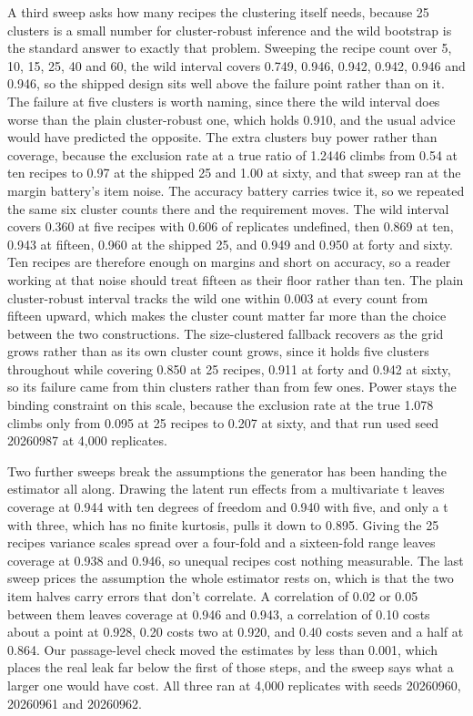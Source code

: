 A third sweep asks how many recipes the clustering itself needs, because 25 clusters is a small number for cluster-robust inference and the wild bootstrap is the standard answer to exactly that problem. Sweeping the recipe count over 5, 10, 15, 25, 40 and 60, the wild interval covers 0.749, 0.946, 0.942, 0.942, 0.946 and 0.946, so the shipped design sits well above the failure point rather than on it. The failure at five clusters is worth naming, since there the wild interval does worse than the plain cluster-robust one, which holds 0.910, and the usual advice would have predicted the opposite. The extra clusters buy power rather than coverage, because the exclusion rate at a true ratio of 1.2446 climbs from 0.54 at ten recipes to 0.97 at the shipped 25 and 1.00 at sixty, and that sweep ran at the margin battery's item noise. The accuracy battery carries twice it, so we repeated the same six cluster counts there and the requirement moves. The wild interval covers 0.360 at five recipes with 0.606 of replicates undefined, then 0.869 at ten, 0.943 at fifteen, 0.960 at the shipped 25, and 0.949 and 0.950 at forty and sixty. Ten recipes are therefore enough on margins and short on accuracy, so a reader working at that noise should treat fifteen as their floor rather than ten. The plain cluster-robust interval tracks the wild one within 0.003 at every count from fifteen upward, which makes the cluster count matter far more than the choice between the two constructions. The size-clustered fallback recovers as the grid grows rather than as its own cluster count grows, since it holds five clusters throughout while covering 0.850 at 25 recipes, 0.911 at forty and 0.942 at sixty, so its failure came from thin clusters rather than from few ones. Power stays the binding constraint on this scale, because the exclusion rate at the true 1.078 climbs only from 0.095 at 25 recipes to 0.207 at sixty, and that run used seed 20260987 at 4,000 replicates.

Two further sweeps break the assumptions the generator has been handing the estimator all along. Drawing the latent run effects from a multivariate t leaves coverage at 0.944 with ten degrees of freedom and 0.940 with five, and only a t with three, which has no finite kurtosis, pulls it down to 0.895. Giving the 25 recipes variance scales spread over a four-fold and a sixteen-fold range leaves coverage at 0.938 and 0.946, so unequal recipes cost nothing measurable. The last sweep prices the assumption the whole estimator rests on, which is that the two item halves carry errors that don't correlate. A correlation of 0.02 or 0.05 between them leaves coverage at 0.946 and 0.943, a correlation of 0.10 costs about a point at 0.928, 0.20 costs two at 0.920, and 0.40 costs seven and a half at 0.864. Our passage-level check moved the estimates by less than 0.001, which places the real leak far below the first of those steps, and the sweep says what a larger one would have cost. All three ran at 4,000 replicates with seeds 20260960, 20260961 and 20260962.

